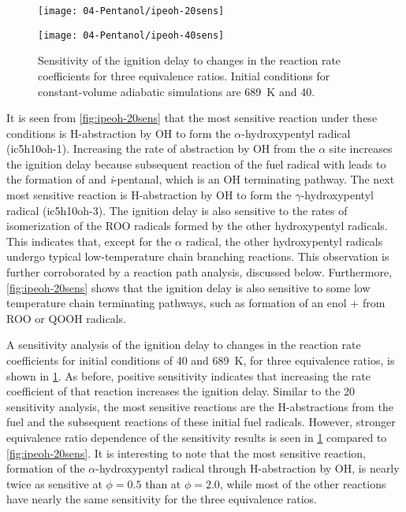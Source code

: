 \documentclass[../main.tex]{subfiles}
\begin{document}
\begin{figure}
    \ffigbox
        {\texttt{[image: 04-Pentanol/ipeoh-20sens]}}
        {\caption{Sensitivity of the ignition delay to changes in
        the reaction rate coefficients for three equivalence ratios.
        Initial conditions for constant-volume adiabatic simulations are
        \SI{800}{\kelvin} and \SI{20}{\atmosphere}.}
        \label{fig:ipeoh-20sens}}
    \par
    \vspace{10pt}
    \ffigbox
        {\texttt{[image: 04-Pentanol/ipeoh-40sens]}}
        {\caption{Sensitivity of the ignition delay to changes in
        the reaction rate coefficients for three equivalence ratios.
        Initial conditions for constant-volume adiabatic simulations are
        \SI{689}{\kelvin} and \SI{40}{\atmosphere}.}
        \label{fig:ipeoh-40sens}}
\end{figure}

It is seen from \cref{fig:ipeoh-20sens} that the most sensitive reaction
under these conditions is H-abstraction by OH to form the $\alpha$-hydroxypentyl
radical (ic5h10oh-1). Increasing the rate of abstraction by OH from the
$\alpha$ site increases the ignition delay because subsequent reaction
of the fuel radical with  leads to the formation of  and
\textit{i}-pentanal, which is an OH terminating pathway. The next most
sensitive reaction is H-abstraction by OH to form the $\gamma$-hydroxypentyl
radical (ic5h10oh-3). The ignition delay is also sensitive to the rates of
isomerization of the ROO radicals formed by the other hydroxypentyl
radicals. This indicates that, except for the $\alpha$ radical, the
other hydroxypentyl radicals undergo typical low-temperature chain branching
reactions. This observation is further corroborated by a reaction path
analysis, discussed below. Furthermore, \cref{fig:ipeoh-20sens} shows that
the ignition delay is also sensitive to some low temperature chain
terminating pathways, such as formation of an enol +  from ROO
or QOOH radicals.

A sensitivity analysis of the ignition delay to changes in the
reaction rate coefficients for initial conditions of \SI{40}{\atmosphere}
and \SI{689}{\kelvin}, for three equivalence ratios, is shown in
\cref{fig:ipeoh-40sens}. As before, positive sensitivity indicates
that increasing the rate coefficient of that reaction increases the
ignition delay. Similar to the \SI{20}{\atmosphere} sensitivity analysis,
the most sensitive reactions are the H-abstractions from the fuel and
the subsequent reactions of these initial fuel radicals. However,
stronger equivalence ratio dependence of the sensitivity results is
seen in \cref{fig:ipeoh-40sens} compared to \cref{fig:ipeoh-20sens}.
It is interesting to note that the most sensitive reaction, formation
of the $\alpha$-hydroxypentyl radical through H-abstraction by
OH, is nearly twice as sensitive at $\phi=0.5$ than at $\phi=2.0$, while
most of the other reactions have nearly the same sensitivity for
the three equivalence ratios.
\end{document}
